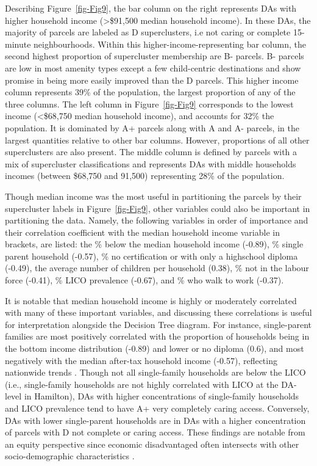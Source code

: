 \documentclass[
  authoryear,
  preprint,
  3p]{elsarticle}
\begin{document}
Describing Figure~\ref{fig-Fig9}, the bar column on the right represents
DAs with higher household income (\textgreater\$91,500 median household
income). In these DAs, the majority of parcels are labeled as D
superclusters, i.e not caring or complete 15-minute neighbourhoods.
Within this higher-income-representing bar column, the second highest
proportion of supercluster membership are B- parcels. B- parcels are low
in most amenity types except a few child-centric destinations and show
promise in being more easily improved than the D parcels. This higher
income column represents 39\% of the population, the largest proportion
of any of the three columns. The left column in Figure~\ref{fig-Fig9}
corresponds to the lowest income (\textless\$68,750 median household
income), and accounts for 32\% the population. It is dominated by A+
parcels along with A and A- parcels, in the largest quantities relative
to other bar columns. However, proportions of all other superclusters
are also present. The middle column is defined by parcels with a mix of
supercluster classifications and represents DAs with middle households
incomes (between \$68,750 and 91,500) representing 28\% of the
population.

Though median income was the most useful in partitioning the parcels by
their supercluster labels in Figure~\ref{fig-Fig9}, other variables
could also be important in partitioning the data. Namely, the following
variables in order of importance and their correlation coefficient with
the median household income variable in brackets, are listed: the \%
below the median household income (-0.89), \% single parent household
(-0.57), \% no certification or with only a highschool diploma (-0.49),
the average number of children per household (0.38), \% not in the
labour force (-0.41), \% LICO prevalence (-0.67), and \% who walk to
work (-0.37).

It is notable that median household income is highly or moderately
correlated with many of these important variables, and discussing these
correlations is useful for interpretation alongside the Decision Tree
diagram. For instance, single-parent families are most positively
correlated with the proportion of households being in the bottom income
distribution (-0.89) and lower or no diploma (0.6), and most negatively
with the median after-tax household income (-0.57), reflecting
nationwide trends
\citep{governmentofcanadaDailyMainHighlights2024, governmentofcanadaPrevalenceLowIncome2024}.
Though not all single-family households are below the LICO (i.e.,
single-family households are not highly correlated with LICO at the
DA-level in Hamilton), DAs with higher concentrations of single-family
households and LICO prevalence tend to have A+ very completely caring
access. Conversely, DAs with lower single-parent households are in DAs
with a higher concentration of parcels with D not complete or caring
access. These findings are notable from an equity perspective since
economic disadvantaged often intersects with other socio-demographic
characteristics
\citep{ravensbergen_exploratory_2023, lightmanMeasuringEconomicExclusion2018}.
\end{document}
